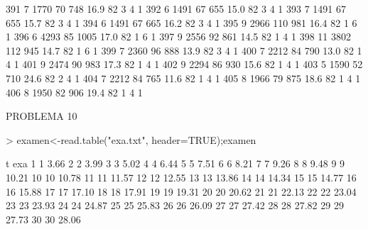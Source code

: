 \documentclass{article}
\begin{document}
\begin{Schunk}
\begin{Soutput}
391       7  1770  70  748 16.9  82      3       4        1
392       6  1491  67  655 15.0  82      3       4        1
393       7  1491  67  655 15.7  82      3       4        1
394       6  1491  67  665 16.2  82      3       4        1
395       9  2966 110  981 16.4  82      1       6        1
396       6  4293  85 1005 17.0  82      1       6        1
397       9  2556  92  861 14.5  82      1       4        1
398      11  3802 112  945 14.7  82      1       6        1
399       7  2360  96  888 13.9  82      3       4        1
400       7  2212  84  790 13.0  82      1       4        1
401       9  2474  90  983 17.3  82      1       4        1
402       9  2294  86  930 15.6  82      1       4        1
403       5  1590  52  710 24.6  82      2       4        1
404       7  2212  84  765 11.6  82      1       4        1
405       8  1966  79  875 18.6  82      1       4        1
406       8  1950  82  906 19.4  82      1       4        1
\end{Soutput}
\end{Schunk}
PROBLEMA 10

\begin{Schunk}
\begin{Sinput}
> examen<-read.table("exa.txt", header=TRUE);examen
\end{Sinput}
\begin{Soutput}
    t   exa
1   1  3.66
2   2  3.99
3   3  5.02
4   4  6.44
5   5  7.51
6   6  8.21
7   7  9.26
8   8  9.48
9   9 10.21
10 10 10.78
11 11 11.57
12 12 12.55
13 13 13.86
14 14 14.34
15 15 14.77
16 16 15.88
17 17 17.10
18 18 17.91
19 19 19.31
20 20 20.62
21 21 22.13
22 22 23.04
23 23 23.93
24 24 24.87
25 25 25.83
26 26 26.09
27 27 27.42
28 28 27.82
29 29 27.73
30 30 28.06
\end{Soutput}
\end{Schunk}
\end{document}
